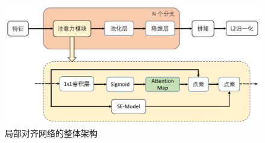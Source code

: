 \begin{figure}[h]
  \centering
  \includegraphics[width=1.0\linewidth]{Img/part.pdf}
  \caption{局部对齐网络的整体架构}
  \label{fig:partnet}
\end{figure}
